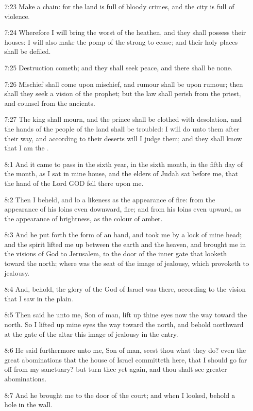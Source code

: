 7:23 Make a chain: for the land is full of bloody crimes, and the city
is full of violence.

7:24 Wherefore I will bring the worst of the heathen, and they shall
possess their houses: I will also make the pomp of the strong to
cease; and their holy places shall be defiled.

7:25 Destruction cometh; and they shall seek peace, and there shall be
none.

7:26 Mischief shall come upon mischief, and rumour shall be upon
rumour; then shall they seek a vision of the prophet; but the law
shall perish from the priest, and counsel from the ancients.

7:27 The king shall mourn, and the prince shall be clothed with
desolation, and the hands of the people of the land shall be troubled:
I will do unto them after their way, and according to their deserts
will I judge them; and they shall know that I am the \LORD.

8:1 And it came to pass in the sixth year, in the sixth month, in the
fifth day of the month, as I sat in mine house, and the elders of
Judah sat before me, that the hand of the Lord GOD fell there upon me.

8:2 Then I beheld, and lo a likeness as the appearance of fire: from
the appearance of his loins even downward, fire; and from his loins
even upward, as the appearance of brightness, as the colour of amber.

8:3 And he put forth the form of an hand, and took me by a lock of
mine head; and the spirit lifted me up between the earth and the
heaven, and brought me in the visions of God to Jerusalem, to the door
of the inner gate that looketh toward the north; where was the seat of
the image of jealousy, which provoketh to jealousy.

8:4 And, behold, the glory of the God of Israel was there, according
to the vision that I saw in the plain.

8:5 Then said he unto me, Son of man, lift up thine eyes now the way
toward the north. So I lifted up mine eyes the way toward the north,
and behold northward at the gate of the altar this image of jealousy
in the entry.

8:6 He said furthermore unto me, Son of man, seest thou what they do?
even the great abominations that the house of Israel committeth here,
that I should go far off from my sanctuary? but turn thee yet again,
and thou shalt see greater abominations.

8:7 And he brought me to the door of the court; and when I looked,
behold a hole in the wall.

